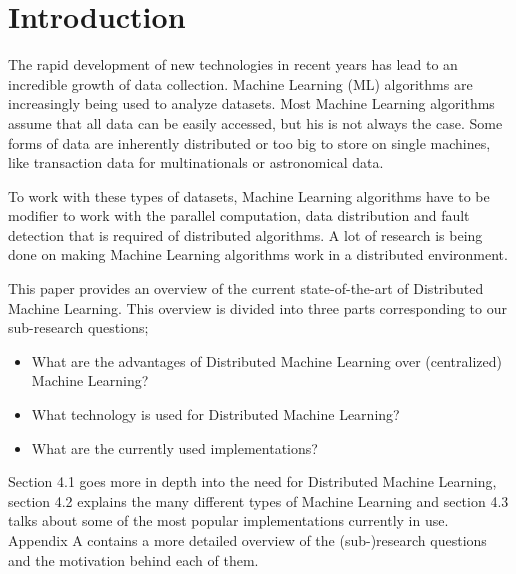 \section{Introduction}


The rapid development of new technologies in recent years has lead to an incredible growth of data collection. Machine Learning (ML) algorithms are increasingly being used to analyze datasets. Most Machine Learning algorithms assume that all data can be easily accessed, but his is not always the case. Some forms of data are inherently distributed or too big to store on single machines, like transaction data for multinationals or astronomical data.

To work with these types of datasets, Machine Learning algorithms have to be modifier to work with the parallel computation, data distribution and fault detection that is required of distributed algorithms. A lot of research is being done on making Machine Learning algorithms work in a distributed environment.

This paper provides an overview of the current state-of-the-art of Distributed Machine Learning. This overview is divided into three parts corresponding to our sub-research questions;
\begin{itemize}
	\item What are the advantages of Distributed Machine Learning over (centralized) Machine Learning?
	\item What technology is used for Distributed Machine Learning?
	\item What are the currently used implementations?
\end{itemize}
Section 4.1 goes more in depth into the need for Distributed Machine Learning, section 4.2 explains the many different types of Machine Learning and section 4.3 talks about some of the most popular implementations currently in use. Appendix A contains a more detailed overview of the (sub-)research questions and the motivation behind each of them.

